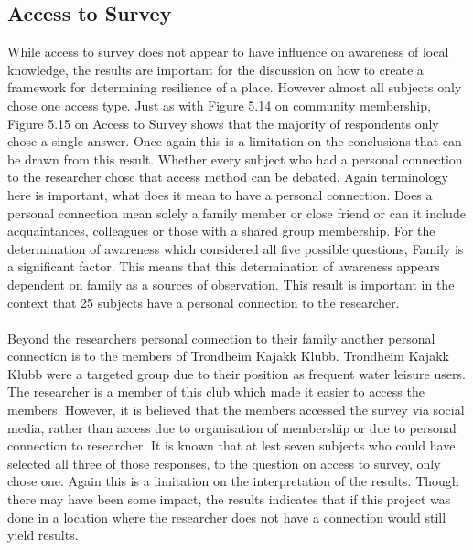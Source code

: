 \subsection{Access to Survey}
While access to survey does not appear to have influence on awareness of local knowledge, the results are important for the discussion on how to create a framework for determining resilience of a place. However almost all subjects only chose one access type. Just as with Figure 5.14 on community membership, Figure 5.15 on Access to Survey shows that the majority of respondents only chose a single answer. Once again this is a limitation on the conclusions that can be drawn from this result. Whether every subject who had a personal connection to the researcher chose that access method can be debated. Again terminology here is important, what does it mean to have a personal connection. Does a personal connection mean solely a family member or close friend or can it include acquaintances, colleagues or those with a shared group membership.  For the determination of awareness which considered all five possible questions, Family is a significant factor. This means that this determination of awareness appears dependent on family as a sources of observation. This result is important in the context that 25 subjects have a personal connection to the researcher.
\paragraph{}
Beyond the researchers personal connection to their family another personal connection is to the members of Trondheim Kajakk Klubb. Trondheim Kajakk Klubb were a targeted group due to their position as frequent water leisure users. The researcher is a member of this club which made it easier to access the members. However, it is believed that the members accessed the survey via social media, rather than access due to organisation of membership or due to personal connection to researcher. It is known that at lest seven subjects who could have selected all three of those responses, to the question on access to survey, only chose one. Again this is a limitation on the interpretation of the results. Though there may have been some impact, the results indicates that if this project was done in a location where the researcher does not have a connection would still yield results.
